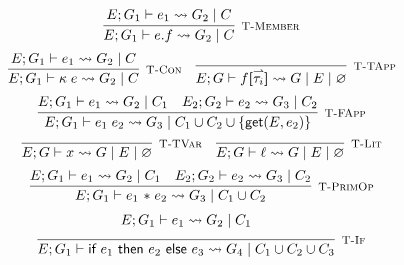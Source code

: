 \begin{figure}
    \centering
    \[
        \infer[\textsc{\footnotesize T-Member}]{
            E; G_1 \vdash e.f
                \rightsquigarrow G_2\; |\; C
        }{
            E; G_1 \vdash e_1 \rightsquigarrow G_2\; |\; C
        }
    \]
    \vspace{0.5pt}
    \[
        \infer[\textsc{\footnotesize T-Con}]{
            E; G_1 \vdash \kappa\; e
                \rightsquigarrow G_2\; |\; C
        }{
            E; G_1 \vdash e_1 \rightsquigarrow G_2\; |\; C
        }
        \hspace{1em}
        \infer[\textsc{\footnotesize T-TApp}]{
            E; G \vdash f\textbf{[}\harpoon{\tau_i}\textbf{]}
                \rightsquigarrow G\; |\; E\; |\; \varnothing
        }{
        }
    \]
    \vspace{0.5pt}
    \[
        \infer[\textsc{\footnotesize T-FApp}]{
            E; G_1 \vdash e_1\; e_2
                \rightsquigarrow G_3\; |\; C_1 \cup C_2 
                \cup \{\textsf{get}(E,e_2)\}
        }{
            E; G_1 \vdash e_1 \rightsquigarrow G_2\; |\; C_1
            \hspace{1em}
            E_2; G_2 \vdash e_2 \rightsquigarrow G_3\; |\; C_2
        }
    \]
    \vspace{0.5pt}
    \[
        \infer[\textsc{\footnotesize T-TVar}]{
            E; G \vdash x
                \rightsquigarrow G\; |\; E\; |\; \varnothing
        }{}
        \hspace{1em}
        \infer[\textsc{\footnotesize T-Lit}]{
            E; G \vdash \ell
                \rightsquigarrow G\; |\; E\; |\; \varnothing
        }{}
    \]
    \vspace{0.5pt}
    \[
        \infer[\textsc{\footnotesize T-PrimOp}]{
            E; G_1 \vdash e_1 \text{ \textasteriskcentered }\; e_2
                \rightsquigarrow G_3\; |\; C_1 \cup C_2
        }{
            E; G_1 \vdash e_1 \rightsquigarrow G_2\; |\; C_1
            \hspace{1em}
            E_2; G_2 \vdash e_2 \rightsquigarrow G_3\; |\; C_2
        }
    \]
    \vspace{0.5pt}
    \[
        \infer[\textsc{\footnotesize T-If}]{
            E; G_1 \vdash \textsf{if } e_1 \textsf{ then } e_2 \textsf{ else } e_3
                \rightsquigarrow G_4\; |\; C_1 \cup C_2 \cup C_3
        }{
            \begin{array}{c}
                E; G_1 \vdash e_1 \rightsquigarrow G_2\; |\; C_1 \\[5pt]

\end{array}}\]
\end{figure}
